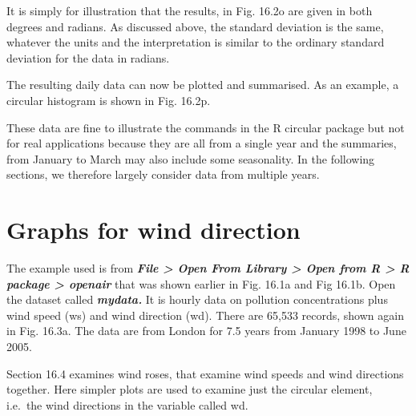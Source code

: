 \documentclass[
  letterpaper,
  DIV=11,
  numbers=noendperiod]{scrreprt}
\begin{document}
It is simply for illustration that the results, in Fig. 16.2o are given
in both degrees and radians. As discussed above, the standard deviation
is the same, whatever the units and the interpretation is similar to the
ordinary standard deviation for the data in radians.

The resulting daily data can now be plotted and summarised. As an
example, a circular histogram is shown in Fig. 16.2p.

These data are fine to illustrate the commands in the R circular package
but not for real applications because they are all from a single year
and the summaries, from January to March may also include some
seasonality. In the following sections, we therefore largely consider
data from multiple years.

\section{Graphs for wind direction}\label{graphs-for-wind-direction}

The example used is from \textbf{\emph{File \textgreater{} Open From
Library \textgreater{} Open from R \textgreater{} R package
\textgreater{} openair}} that was shown earlier in Fig. 16.1a and Fig
16.1b. Open the dataset called \textbf{\emph{mydata.}} It is hourly data
on pollution concentrations plus wind speed (ws) and wind direction
(wd). There are 65,533 records, shown again in Fig. 16.3a. The data are
from London for 7.5 years from January 1998 to June 2005.

Section 16.4 examines wind roses, that examine wind speeds and wind
directions together. Here simpler plots are used to examine just the
circular element, i.e.~the wind directions in the variable called wd.
\end{document}
